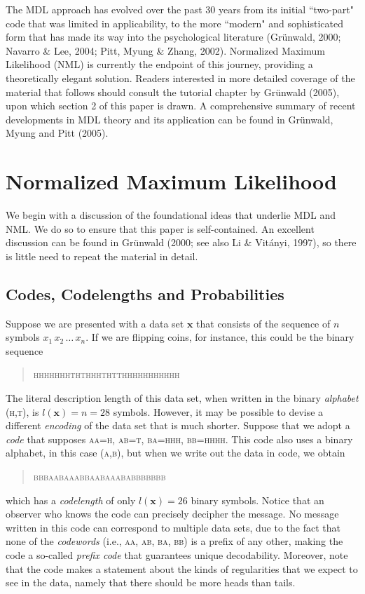 \documentclass{elsart}
\begin{document}
The MDL approach has evolved over the past 30 years from its initial ``two-part" code that was
 limited in applicability, to the more ``modern" and sophisticated form that has made its way
into the psychological literature (Gr\"{u}nwald, 2000; Navarro \& Lee, 2004; Pitt, Myung \& Zhang,
2002). Normalized Maximum Likelihood (NML) is currently the endpoint of this journey, providing a
theoretically elegant solution. Readers interested in more detailed coverage of the material that
follows should consult the tutorial chapter by Gr{\"{u}}nwald (2005), upon which section 2 of this
paper is drawn. A comprehensive summary of recent developments in MDL theory and its application
can be found in Gr{\"{u}}nwald, Myung and Pitt (2005).

\section{Normalized Maximum Likelihood}

We begin with a discussion of the foundational ideas that underlie MDL and NML. We do so to ensure
that this paper is self-contained. An excellent discussion can be found in Gr\"{u}nwald (2000; see
also Li \& Vit\'{a}nyi, 1997), so there is little need to repeat the material in detail.

\subsection{Codes, Codelengths and Probabilities}

Suppose we are presented with a data set $\bm x$ that consists of the sequence of $n$ symbols
 $x_1 \, x_2 \, \ldots\, x_n$. If we are flipping coins, for instance, this could be the binary
sequence
\begin{quote}
\textsc{hhhhhhhththhhthtthhhhhhhhhhh}
\end{quote}
The literal description length of this data set, when written in the
binary \emph{alphabet} (\textsc{h,t}), is $l(\bm x)=n=28$ symbols. However, it may be possible to
devise a different {\it encoding} of the data set that is much shorter. Suppose that we adopt
 a \emph{code} that supposes \textsc{aa=h, ab=t, ba=hhh, bb=hhhh}. This code also uses a
binary alphabet, in this case (\textsc{a,b}), but when we write out the data in code, we obtain
\begin{quote}
\textsc{bbbaabaaabbaabaaababbbbbbb}
\end{quote}
which has a \emph{codelength} of only $l(\bm x)=26$ binary symbols. Notice that an observer who
knows the code can precisely decipher the message. No message written in this code can correspond
to multiple data sets, due to the fact that none of the \emph{codewords} (i.e., \textsc{aa, ab,
ba, bb}) is a prefix of any other, making the code a so-called \emph{prefix code} that guarantees
unique decodability. Moreover, note that the code makes a statement about the kinds of
regularities that we expect to see in the data, namely that there should be more heads than tails.
\end{document}
